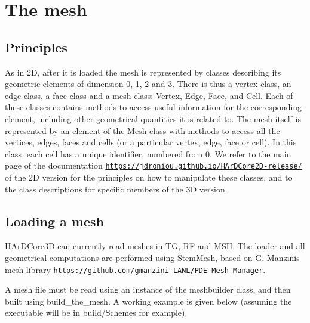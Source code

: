 \label{_mesh}%
 \hypertarget{index_mesh}{}\section{The mesh}\label{index_mesh}
\hypertarget{index_meshpple}{}\subsection{Principles}\label{index_meshpple}
As in 2D, after it is loaded the mesh is represented by classes describing its geometric elements of dimension 0, 1, 2 and 3. There is thus a {\ttfamily vertex} class, an {\ttfamily edge} class, a {\ttfamily face} class and a {\ttfamily mesh} class\+: \hyperlink{classHArDCore3D_1_1Vertex}{Vertex}, \hyperlink{classHArDCore3D_1_1Edge}{Edge}, \hyperlink{classHArDCore3D_1_1Face}{Face}, and \hyperlink{classHArDCore3D_1_1Cell}{Cell}. Each of these classes contains methods to access useful information for the corresponding element, including other geometrical quantities it is related to. The mesh itself is represented by an element of the \hyperlink{classHArDCore3D_1_1Mesh}{Mesh} class with methods to access all the vertices, edges, faces and cells (or a particular vertex, edge, face or cell). In this class, each cell has a unique identifier, numbered from 0. We refer to the main page of the documentation \href{https://jdroniou.github.io/HArDCore2D-release/}{\tt https\+://jdroniou.\+github.\+io/\+H\+Ar\+D\+Core2\+D-\/release/} of the 2D version for the principles on how to manipulate these classes, and to the class descriptions for specific members of the 3D version.\hypertarget{index_loading_mesh}{}\subsection{Loading a mesh}\label{index_loading_mesh}
H\+Ar\+D\+Core3D can currently read meshes in {\ttfamily TG}, {\ttfamily RF} and {\ttfamily M\+SH}. The loader and all geometrical computations are performed using {\ttfamily Stem\+Mesh}, based on G. Manzini\textquotesingle{}s mesh library \href{https://github.com/gmanzini-LANL/PDE-Mesh-Manager}{\tt https\+://github.\+com/gmanzini-\/\+L\+A\+N\+L/\+P\+D\+E-\/\+Mesh-\/\+Manager}.

A mesh file must be read using an instance of the {\ttfamily meshbuilder} class, and then built using {\ttfamily build\+\_\+the\+\_\+mesh}. A working example is given below (assuming the executable will be in {\ttfamily build/\+Schemes} for example).


